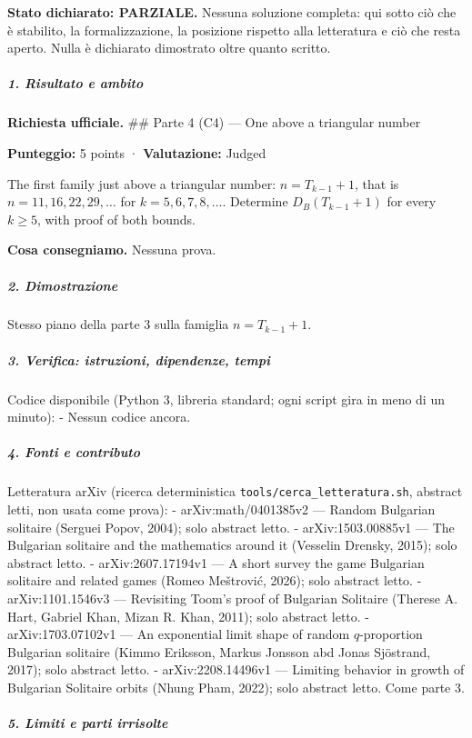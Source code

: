 \documentclass[11pt,a4paper]{article}
\begin{document}
\textbf{Stato dichiarato: PARZIALE.} Nessuna soluzione completa: qui
sotto ciò che è stabilito, la formalizzazione, la posizione rispetto
alla letteratura e ciò che resta aperto. Nulla è dichiarato dimostrato
oltre quanto scritto.

\subparagraph{1. Risultato e ambito}\label{risultato-e-ambito}

\textbf{Richiesta ufficiale.} \#\# Parte 4 (C4) --- One above a
triangular number

\textbf{Punteggio:} 5 points · \textbf{Valutazione:} Judged

The first family just above a triangular number: \(n = T_{k-1} + 1\),
that is \(n = 11, 16, 22, 29, \ldots\) for \(k = 5, 6, 7, 8, \ldots\).
Determine \(D_B(T_{k-1} + 1)\) for every \(k \ge 5\), with proof of both
bounds.

\textbf{Cosa consegniamo.} Nessuna prova.

\subparagraph{2. Dimostrazione}\label{dimostrazione}

Stesso piano della parte 3 sulla famiglia \(n=T_{k-1}+1\).

\subparagraph{3. Verifica: istruzioni, dipendenze,
tempi}\label{verifica-istruzioni-dipendenze-tempi}

Codice disponibile (Python 3, libreria standard; ogni script gira in
meno di un minuto): - Nessun codice ancora.

\subparagraph{4. Fonti e contributo}\label{fonti-e-contributo}

Letteratura arXiv (ricerca deterministica
\texttt{tools/cerca\_letteratura.sh}, abstract letti, non usata come
prova): - arXiv:math/0401385v2 --- Random Bulgarian solitaire (Serguei
Popov, 2004); solo abstract letto. - arXiv:1503.00885v1 --- The
Bulgarian solitaire and the mathematics around it (Vesselin Drensky,
2015); solo abstract letto. - arXiv:2607.17194v1 --- A short survey the
game Bulgarian solitaire and related games (Romeo Meštrović, 2026); solo
abstract letto. - arXiv:1101.1546v3 --- Revisiting Toom's proof of
Bulgarian Solitaire (Therese A. Hart, Gabriel Khan, Mizan R. Khan,
2011); solo abstract letto. - arXiv:1703.07102v1 --- An exponential
limit shape of random \(q\)-proportion Bulgarian solitaire (Kimmo
Eriksson, Markus Jonsson abd Jonas Sjöstrand, 2017); solo abstract
letto. - arXiv:2208.14496v1 --- Limiting behavior in growth of Bulgarian
Solitaire orbits (Nhung Pham, 2022); solo abstract letto. Come parte 3.

\subparagraph{5. Limiti e parti
irrisolte}\label{limiti-e-parti-irrisolte}
\end{document}
